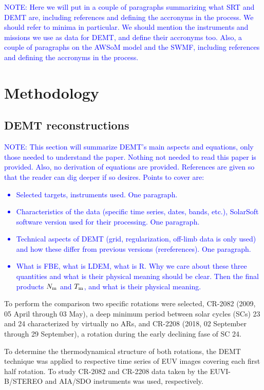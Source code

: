 \documentclass[namedreferences]{solarphysics}
\newcommand{\Tm}{T_{\rm m}}
\newcommand{\Nm}{N_{\rm m}}
\def\notebyalbert#1{\textcolor{blue}{NOTE: #1}}
\begin{document}
\begin{article}
\noindent\notebyalbert{Here we will put in a couple of paragraphs summarizing what SRT and DEMT are, including references and defining the accronyms in the process. We should refer to minima in particular. We should mention the instruments and missions we use as data for DEMT, and define their accronyms too. Also, a couple of paragraphs on the AWSoM model and the SWMF, including references and defining the accronyms in the process.}

\section{Methodology}\label{meto}   

\subsection{DEMT reconstructions}\label{demt}

\noindent\notebyalbert{This section will summarize DEMT's main aspects and equations, only those needed to understand the paper. Nothing not needed to read this paper is provided. Also, no derivation of equations are provided. References are given so that the reader can dig deeper if so desires. Points to cover are:
\begin{itemize}
  \item Selected targets, instruments used. One paragraph.
  \item Characteristics of the data (specific time series, dates, bands, etc.), SolarSoft software version used for their processing. One paragraph.
  \item Technical aspects of DEMT (grid, regularization, off-limb data is only used) and how these differ from previous versions (rereferences). One paragraph.
  \item What is FBE, what is LDEM, what is R. Why we care about these three quantities and what is their physical meaning should be clear. Then the final products $\Nm$ and $\Tm$, and what is their physical meaning.
\end{itemize}
}

To perform the comparison two specific rotations were selected, CR-2082 (2009, 05 April through 03 May), a deep minimum period between solar cycles (SCs) 23 and 24 characterized by virtually no ARs, and CR-2208 (2018, 02 September through 29 September), a rotation during the early declining fase of SC 24.

To determine the thermodynamical structure of both rotations, the DEMT technique was applied to respective time series of EUV images covering each first half rotation. To study CR-2082 and CR-2208 data taken by the EUVI-B/STEREO and AIA/SDO instruments was used, respectively.


\end{article}
\end{document}
